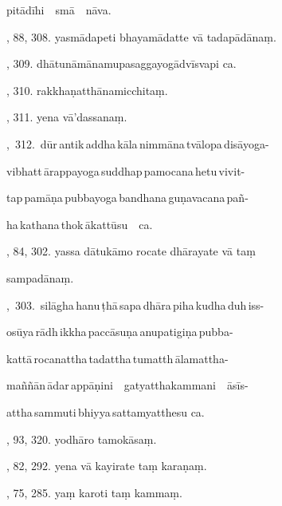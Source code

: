 \hspace{15mm} pitādīhi\ \ smā\ \ nāva.\hfill \pageref{sut:270}\par {}, 88, 308. yasmādapeti bhayamādatte vā tadapādānaṃ.\par \noindent
\hfill \pageref{sut:271}\par {}, 309. dhātunāmānamupasaggayogādvīsvapi ca.\hfill \pageref{sut:272}\par {}, 310. rakkhaṇatthānamicchitaṃ.\hfill \pageref{sut:273}\par {}, 311. yena vā’dassanaṃ.\hfill \pageref{sut:274}\par {},~312.~dūr\,antik\,addha\,kāla\,nimmāna\,tvālopa\,disāyoga-\par \noindent
\hspace{15mm} vibhatt\,ārappayoga\,suddhap\,pamocana\,hetu\,vivit-\par \noindent
\hspace{15mm} tap\,pamāṇa\,pubbayoga\,bandhana\,guṇavacana\,pañ-\par \noindent
\hspace{15mm} ha\,kathana\,thok\,ākattūsu\ \ ca.\hfill \pageref{sut:275}\par {}, 84, 302. yassa dātukāmo rocate dhārayate vā taṃ\par \noindent
\hspace{15mm} sampadānaṃ.\hfill \pageref{sut:276}\par {},~303.~silāgha\,hanu\,ṭhā\,sapa\,dhāra\,piha\,kudha\,duh\,iss-\par \noindent
\hspace{15mm} osūya\,rādh\,ikkha\,paccāsuṇa\,anupatigiṇa\,pubba-\par \noindent
\hspace{15mm} kattā\,rocanattha\,tadattha\,tumatth\,ālamattha-\par \noindent
\hspace{15mm} maññān\,ādar\,appāṇini\ \ gatyatthakammani\ \ āsīs-\par \noindent
\hspace{15mm} attha\,sammuti\,bhiyya\,sattamyatthesu ca.\hfill \pageref{sut:277}\par {}, 93, 320. yodhāro tamokāsaṃ.\hfill \pageref{sut:278}\par {}, 82, 292. yena vā kayirate taṃ karaṇaṃ.\hfill \pageref{sut:279}\par {}, 75, 285. yaṃ karoti taṃ kammaṃ.\hfill \pageref{sut:280}\par \noindent
